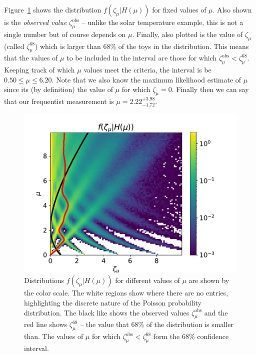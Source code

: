 \begin{tcolorbox}[colback=backblue]
Figure~\ref{fig:neyman_counting} shows the distribution $f(\zeta_{\mu}|H(\mu))$ for fixed values of $\mu$. Also shown is the \emph{observed value} $\zeta^\mathrm{obs}_{\mu}$ -- unlike the solar temperature example, this is not a single number but of course depends on $\mu$. Finally, also plotted is the value of $\zeta_{\mu}$ (called $\zeta_{\mu}^{68}$) which is larger than 68\% of the toys in the distribution. This means that the values of $\mu$ to be included in the interval are those for which $\zeta^\mathrm{obs}_{\mu}< \zeta_{\mu}^{68}$. Keeping track of which $\mu$ values meet the criteria, the interval is be $0.50\leq\mu\leq6.20$. Note that we also know the maximum likelihood estimate of $\mu$ since its (by definition) the value of $\mu$ for which $\zeta_{\mu}=0$. Finally then we can say that our frequentist measurement is $\mu=2.22^{+3.98}_{-1.72}$.
\end{tcolorbox}
\begin{figure}[hbt!]
    \centering
    \includegraphics[width=\textwidth]{figures/Intervals/frequentist_interval.pdf}
    \caption{Distributions $f(\zeta_\mu|H(\mu))$ for different values of $\mu$ are shown by the color scale. The white regions show where there are no entries, highlighting the discrete nature of the Poisson probability distribution. The black like shows the observed values $\zeta_\mu^{\mathrm{obs}}$ and the red line shows $\zeta_{\mu}^{68}$ -- the value that 68\% of the distribution is smaller than. The values of $\mu$ for which $\zeta_\mu^{\mathrm{obs}} < \zeta_{\mu}^{68}$ form the 68\% confidence interval. }
    \label{fig:neyman_counting}
\end{figure}
